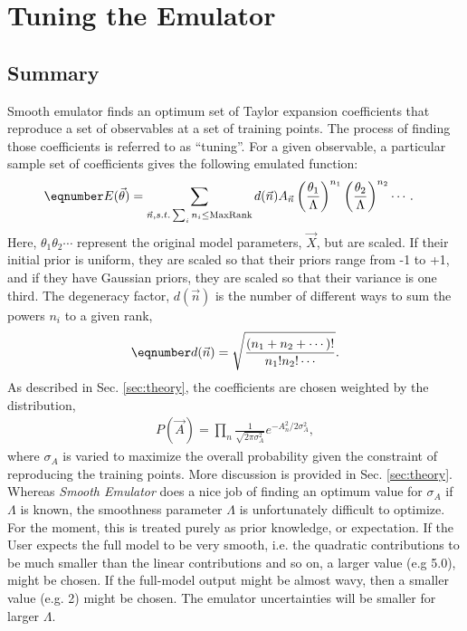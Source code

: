 \documentclass[UserManual.tex]{subfiles}
\begin{document}
\setcounter{section}{4}
\section{Tuning the Emulator}\label{sec:emulator}

\subsection{Summary}

Smooth emulator finds an optimum set of Taylor expansion coefficients that reproduce a set of observables at a set of training points. The process of finding those coefficients is referred to as ``tuning''. For a given observable, a particular sample set of coefficients gives the following emulated function:
\begin{align*}\eqnumber
E(\vec{\theta})&=\sum_{\vec{n}, s.t. \sum_in_i\le {\rm MaxRank}}d(\vec{n})A_{\vec{n}}
\left(\frac{\theta_1}{\Lambda}\right)^{n_1}
\left(\frac{\theta_2}{\Lambda}\right)^{n_2}
\cdots.
\end{align*}
Here, $\theta_1\theta_2\cdots$ represent the original model parameters, $\vec{X}$, but are scaled. If their initial prior is uniform, they are scaled so that their priors range from -1 to +1, and if they have  Gaussian priors, they are scaled so that their variance is one third. The degeneracy factor, $d(\vec{n})$ is the number of different ways to sum the powers $n_i$ to a given rank,
\begin{align*}\eqnumber
d(\vec{n})=\sqrt{\frac{(n_1+n_2+\cdots)!}{n_1!n_2!\cdots}}.
\end{align*}
As described in Sec. \ref{sec:theory}, the coefficients are chosen weighted by the distribution,
\begin{eqnarray}\label{eq:EmuWeight}
P(\vec{A})=\prod_n\frac{1}{\sqrt{2\pi\sigma_A^2}}e^{-A_n^2/2\sigma_A^2},
\end{eqnarray}
where $\sigma_A$ is varied to maximize the overall probability given the constraint of reproducing the training points. More discussion is provided in Sec. \ref{sec:theory}. Whereas {\it Smooth Emulator} does a nice job of finding an optimum value for $\sigma_A$ if $\Lambda$ is known, the smoothness parameter $\Lambda$ is unfortunately difficult to optimize. For the moment, this is treated purely as prior knowledge, or expectation. If the User expects the full model to be very smooth, i.e. the quadratic contributions to be much smaller than the linear contributions and so on, a larger value (e.g 5.0), might be chosen. If the full-model output might be almost wavy, then a smaller value (e.g. 2) might be chosen. The emulator uncertainties will be smaller for larger $\Lambda$.
\end{document}
